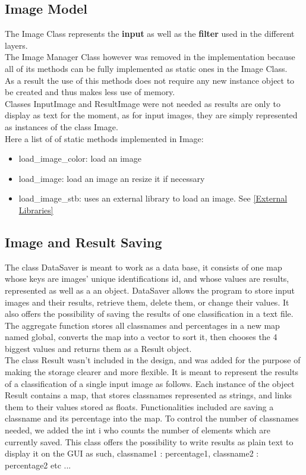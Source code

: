 \documentclass[parskip=full]{scrartcl}
\newcommand\tab[1][1cm]{\hspace*{#1}}
\begin{document}
	\subsection {Image Model}
	\tab The Image Class represents the \textbf{input} as well as the \textbf{filter} used in the different layers.\\
	The Image Manager Class however was removed in the implementation because all of its methods can be fully implemented as static ones in the Image Class.\\ As a result the use of this methods does not require any new instance object to be created and thus makes less use of memory. \\ Classes InputImage and ResultImage were not needed as results are only to display as text for the moment, as for input images, they are simply represented as instances of the class Image.\\ Here a list of of static methods implemented in Image:
	\begin {itemize}
		\item load\_image\_color: load an image
		\item load\_image: load an image an resize it if necessary
		\item load\_image\_stb: uses an external library to load an image. See \ref{External Libraries}
	\end{itemize}
	\subsection {Image and Result Saving}
	\tab The class DataSaver is meant to work as a data base, it consists of one map whose keys are images' unique identifications id, and whose values are results, represented as well as a an object. DataSaver allows the program to store input images and their results, retrieve them, delete them, or change their values. It also offers the possibility of saving the results of one classification in a text file. \\The aggregate function stores all classnames and percentages in a new map named global, converts the map into a vector to sort it, then chooses the 4 biggest values and returns them as a Result object.
\\The class Result wasn't included in the design, and was added for the purpose of making the storage clearer and more flexible. It is meant to represent the results of a classification of a single input image as follows. Each instance of the object Result contains a map, that stores classnames represented as strings, and links them to their values stored as floats. Functionalities included are saving a classname and its percentage into the map. To control the number of classnames needed, we added the int i who counts the number of elements which are currently saved. This class offers the possibility to write results as plain text to display it on the GUI as such, classname1 : percentage1, classname2 : percentage2 etc ... 
\end{document}
